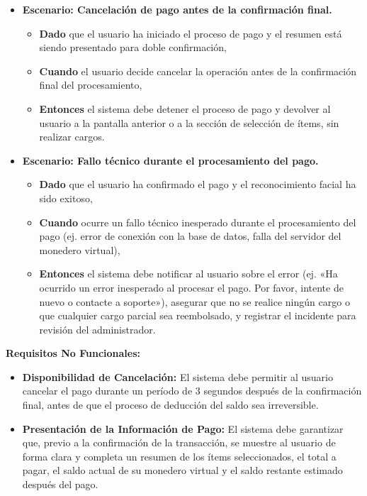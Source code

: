 \documentclass[12pt]{article}
\begin{document}
\begin{itemize}
	\item \textbf{Escenario: Cancelación de pago antes de la confirmación final.}
	\begin{itemize}
		\item \textbf{Dado} que el usuario ha iniciado el proceso de pago y el resumen está siendo presentado para doble confirmación,
		\item \textbf{Cuando} el usuario decide cancelar la operación antes de la confirmación final del procesamiento,
		\item \textbf{Entonces} el sistema debe detener el proceso de pago y devolver al usuario a la pantalla anterior o a la sección de selección de ítems, sin realizar cargos.
	\end{itemize}

	\item \textbf{Escenario: Fallo técnico durante el procesamiento del pago.}
	\begin{itemize}
		\item \textbf{Dado} que el usuario ha confirmado el pago y el reconocimiento facial ha sido exitoso,
		\item \textbf{Cuando} ocurre un fallo técnico inesperado durante el procesamiento del pago (ej. error de conexión con la base de datos, falla del servidor del monedero virtual),
		\item \textbf{Entonces} el sistema debe notificar al usuario sobre el error (ej. «Ha ocurrido un error inesperado al procesar el pago. Por favor, intente de nuevo o contacte a soporte»), asegurar que no se realice ningún cargo o que cualquier cargo parcial sea reembolsado, y registrar el incidente para revisión del administrador.
	\end{itemize}
\end{itemize}

\textbf{Requisitos No Funcionales:}
\begin{itemize}
	\item \textbf{Disponibilidad de Cancelación:} El sistema debe permitir al usuario cancelar el pago durante un período de 3 segundos después de la confirmación final, antes de que el proceso de deducción del saldo sea irreversible.
	\item \textbf{Presentación de la Información de Pago:} El sistema debe garantizar que, previo a la confirmación de la transacción, se muestre al usuario de forma clara y completa un resumen de los ítems seleccionados, el total a pagar, el saldo actual de su monedero virtual y el saldo restante estimado después del pago.
\end{itemize}
\end{document}

